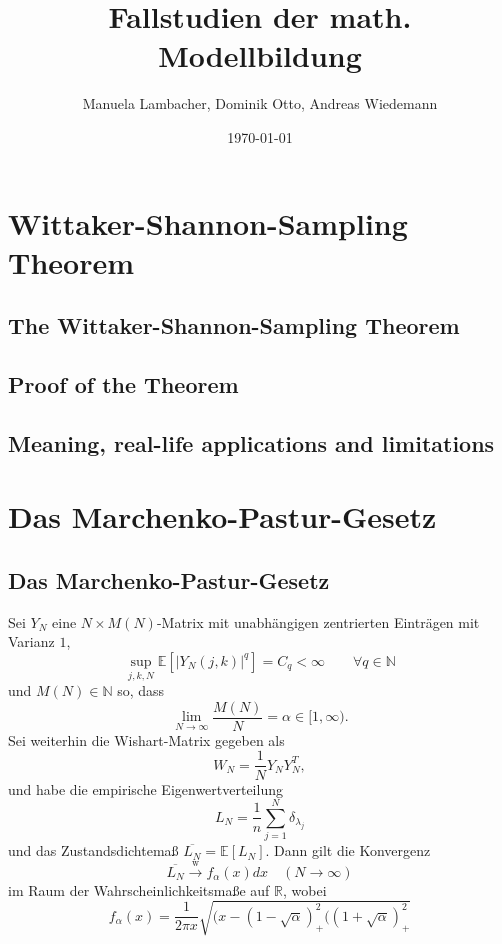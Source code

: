 \documentclass[a4paper, 11pt]{scrreprt}
\title{Fallstudien der math. Modellbildung}
\author{Manuela Lambacher, Dominik Otto, Andreas Wiedemann}
\date{\today}
\newcommand{\RR}{\mathbb{R}}
\newcommand{\EE}{\mathbb{E}}
\newcommand{\NN}{\mathbb{N}}
\begin{document}
\parindent 0pt
\maketitle
\tableofcontents

\chapter{Wittaker-Shannon-Sampling Theorem}

\section{The Wittaker-Shannon-Sampling Theorem}
\section{Proof of the Theorem}
\section{Meaning, real-life applications and limitations}

\chapter{Das Marchenko-Pastur-Gesetz}

\section{Das Marchenko-Pastur-Gesetz}

Sei \(Y_N\) eine \(N\times M(N)\)-Matrix mit unabhängigen zentrierten Einträgen mit Varianz \(1\),
	\[\sup_{j,k,N} \EE\left[ | Y_N(j,k)|^q\right] = C_q < \infty \qquad \forall q \in \NN\]
und \(M(N) \in \NN\) so, dass
	\[\lim_{N\to\infty} \frac{M(N)}{N} = \alpha \in[1,\infty). \]
Sei weiterhin die Wishart-Matrix gegeben als 
	\[W_N = \frac{1}{N}Y_NY_N^T,\]
und habe die empirische Eigenwertverteilung
	\[L_N = \frac{1}{n} \sum_{j=1}^{N} \delta_{\lambda_j} \]
und das Zustandsdichtemaß \(\overline{L_N} = \EE[L_N]\). Dann gilt die Konvergenz
	\[\overline{L_N} \xrightarrow{\text{w}} f_{\alpha}(x)dx \quad(N\to\infty)\]
im Raum der Wahrscheinlichkeitsmaße auf \(\RR\), wobei
	\[f_{\alpha}(x)=\frac{1}{2\pi x}\sqrt{(x-(1-\sqrt{\alpha})^2_{+}((1+\sqrt{\alpha})^2_{+}} \]
\end{document}
